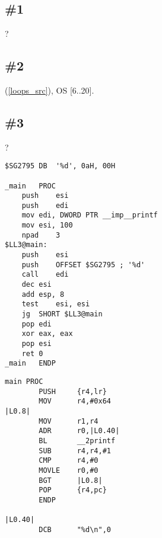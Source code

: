 \section{\Exercises}

\subsection{\Exercise \#1}

 \LOOP {}?

\subsection{\Exercise \#2}

(\ref{loops_src}), 
 \ac{OS}
 [6..20].

\subsection{\Exercise \#3}
\label{exercise_loops_3}

?

\begin{lstlisting}[caption=MSVC 2010 /Ox]
$SG2795	DB	'%d', 0aH, 00H

_main	PROC
	push	esi
	push	edi
	mov	edi, DWORD PTR __imp__printf
	mov	esi, 100
	npad	3
$LL3@main:
	push	esi
	push	OFFSET $SG2795 ; '%d'
	call	edi
	dec	esi
	add	esp, 8
	test	esi, esi
	jg	SHORT $LL3@main
	pop	edi
	xor	eax, eax
	pop	esi
	ret	0
_main	ENDP
\end{lstlisting}

\begin{lstlisting}[caption=Keil 5.03 (\ARMMode)]
main PROC
        PUSH     {r4,lr}
        MOV      r4,#0x64
|L0.8|
        MOV      r1,r4
        ADR      r0,|L0.40|
        BL       __2printf
        SUB      r4,r4,#1
        CMP      r4,#0
        MOVLE    r0,#0
        BGT      |L0.8|
        POP      {r4,pc}
        ENDP

|L0.40|
        DCB      "%d\n",0
\end{lstlisting}

